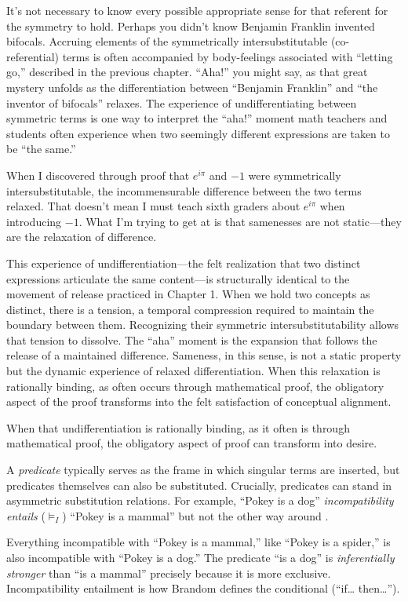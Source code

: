 \documentclass[12pt]{book}
\begin{document}
It's not necessary to know every possible appropriate sense for that referent for the symmetry to hold. Perhaps you didn't know Benjamin Franklin invented bifocals. Accruing elements of the symmetrically intersubstitutable (co-referential) terms is often accompanied by body-feelings associated with ``letting go,'' described in the previous chapter. ``Aha!'' you might say, as that great mystery unfolds as the differentiation between ``Benjamin Franklin'' and ``the inventor of bifocals'' relaxes. The experience of undifferentiating between symmetric terms is one way to interpret the ``aha!'' moment math teachers and students often experience when two seemingly different expressions are taken to be ``the same.''

When I discovered through proof that \(e^{i\pi}\) and \(-1\) were symmetrically intersubstitutable, the incommensurable difference between the two terms relaxed. That doesn't mean I must teach sixth graders about \(e^{i\pi}\) when introducing \(-1\). What I'm trying to get at is that samenesses are not static---they are the relaxation of difference.

This experience of undifferentiation---the felt realization that two distinct expressions articulate the same content---is structurally identical to the movement of release practiced in Chapter 1. When we hold two concepts as distinct, there is a tension, a temporal compression required to maintain the boundary between them. Recognizing their symmetric intersubstitutability allows that tension to dissolve. The ``aha'' moment is the expansion that follows the release of a maintained difference. Sameness, in this sense, is not a static property but the dynamic experience of relaxed differentiation. When this relaxation is rationally binding, as often occurs through mathematical proof, the obligatory aspect of the proof transforms into the felt satisfaction of conceptual alignment.

When that undifferentiation is rationally binding, as it often is through mathematical proof, the obligatory aspect of proof can transform into desire.

A \emph{predicate} typically serves as the frame in which singular terms are inserted, but predicates themselves can also be substituted. Crucially, predicates can stand in asymmetric substitution relations. For example, ``Pokey is a dog'' \emph{incompatibility entails} (\(\vDash_I\)) ``Pokey is a mammal'' but not the other way around \parencite{Brandom2008}.

Everything incompatible with ``Pokey is a mammal,'' like ``Pokey is a spider,'' is also incompatible with ``Pokey is a dog.'' The predicate ``is a dog'' is \emph{inferentially stronger} than ``is a mammal'' precisely because it is more exclusive. Incompatibility entailment is how Brandom defines the conditional (``if\ldots{} then\ldots{}'').
\end{document}
